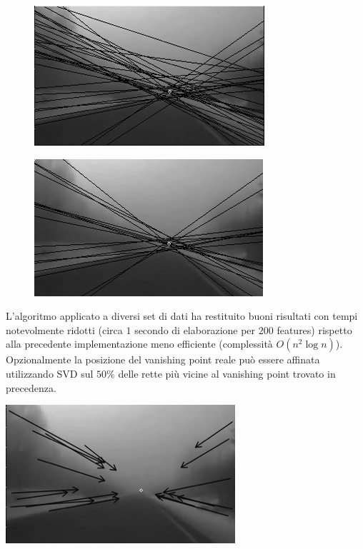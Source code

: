 \documentclass[12pt]{report}
\begin{document}
\begin{figure}
	\begin{minipage}[b]{0.5\linewidth}
		\centering
		\includegraphics[scale=0.6]{images/iaasBefore.png}
		\label{fig:vpBef}
	\end{minipage}
	\hspace{0.5cm}
	\begin{minipage}[b]{0.5\linewidth}
		\centering
		\includegraphics[scale=0.6]{images/iaasAfter.png}
		\label{fig:vpAft}
	\end{minipage}


\end{figure}

\noindent L'algoritmo applicato a diversi set di dati ha restituito buoni risultati con tempi notevolmente ridotti (circa $1$ secondo di elaborazione per $200$ features) rispetto alla precedente implementazione meno efficiente (complessit\`a $O\left(n^2\log{n}\right)$).\\

\noindent Opzionalmente la posizione del vanishing point reale pu\`o essere affinata utilizzando SVD sul $50\%$ delle rette pi\`u vicine al vanishing point trovato in precedenza.\\

\begin{center}
	\includegraphics[scale=0.7]{images/iaasAfterArrow.png}
	\label{fig:vpAftArr}
\end{center}
\end{document}
